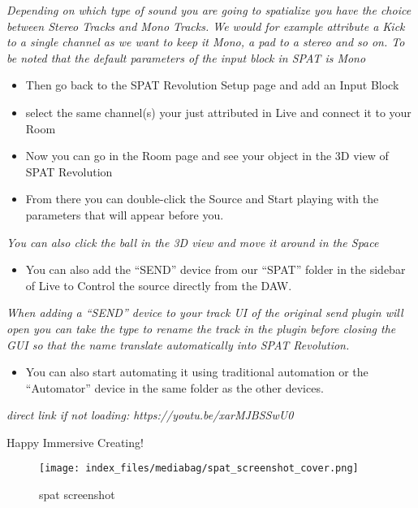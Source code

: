 \documentclass[
  letterpaper,
  DIV=11,
  numbers=noendperiod]{scrreport}
\providecommand{\tightlist}{%
  \setlength{\itemsep}{0pt}\setlength{\parskip}{0pt}}\usepackage{longtable,booktabs,array}
\begin{document}
\emph{Depending on which type of sound you are going to spatialize you
have the choice between Stereo Tracks and Mono Tracks. We would for
example attribute a Kick to a single channel as we want to keep it Mono,
a pad to a stereo and so on. To be noted that the default parameters of
the input block in SPAT is Mono}

\begin{itemize}
\tightlist
\item
  Then go back to the SPAT Revolution Setup page and add an Input Block
\item
  select the same channel(s) your just attributed in Live and connect it
  to your Room
\item
  Now you can go in the Room page and see your object in the 3D view of
  SPAT Revolution
\item
  From there you can double-click the Source and Start playing with the
  parameters that will appear before you.
\end{itemize}

\emph{You can also click the ball in the 3D view and move it around in
the Space}

\begin{itemize}
\tightlist
\item
  You can also add the ``SEND'' device from our ``SPAT'' folder in the
  sidebar of Live to Control the source directly from the DAW.
\end{itemize}

\emph{When adding a ``SEND'' device to your track UI of the original
send plugin will open you can take the type to rename the track in the
plugin before closing the GUI so that the name translate automatically
into SPAT Revolution.}

\begin{itemize}
\tightlist
\item
  You can also start automating it using traditional automation or the
  ``Automator'' device in the same folder as the other devices.
\end{itemize}

\emph{direct link if not loading: https://youtu.be/xarMJBSSwU0}

Happy Immersive Creating!

\begin{figure}

{\centering \texttt{[image: index\_files/mediabag/spat\_screenshot\_cover.png]}

}

\caption{spat screenshot}

\end{figure}
\end{document}
